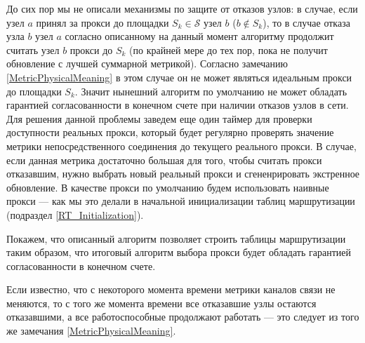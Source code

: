 До сих пор мы не описали механизмы по защите от отказов узлов: в случае, если узел $a$ принял за прокси до площадки $S_k \in \mathcal{S}$ узел $b$ ($b \notin S_k$), то в случае отказа узла $b$ узел $a$ согласно описанному на данный момент алгоритму продолжит считать узел $b$ прокси до $S_k$ (по крайней мере до тех пор, пока не получит обновление с лучшей суммарной метрикой). Согласно замечанию \ref{MetricPhysicalMeaning} в этом случае он не может являться идеальным прокси до площадки $S_k$. Значит нынешний алгоритм по умолчанию не может обладать гарантией согласованности в конечном счете при наличии отказов узлов в сети. Для решения данной проблемы заведем еще один таймер для проверки доступности реальных прокси, который будет регулярно проверять значение метрики непосредственного соединения до текущего реального прокси. В случае, если данная метрика достаточно большая для того, чтобы считать прокси отказавшим, нужно выбрать новый реальный прокси и сгененрировать экстренное обновление. В качестве прокси по умолчанию будем использовать наивные прокси --- как мы это делали в начальной инициализации таблиц маршрутизации (подраздел \ref{RT_Initialization}).

Покажем, что описанный алгоритм позволяет строить таблицы маршрутизации таким образом, что итоговый алгоритм выбора прокси будет обладать гарантией согласованности в конечном счете.

\begin{remark}
\label{NoCrashesWhenMetricIsStable}
    Если известно, что с некоторого момента времени метрики каналов связи не меняются, то с того же момента времени все отказавшие узлы остаются отказавшими, а все работоспособные продолжают работать --- это следует из того же замечания \ref{MetricPhysicalMeaning}.
\end{remark}

